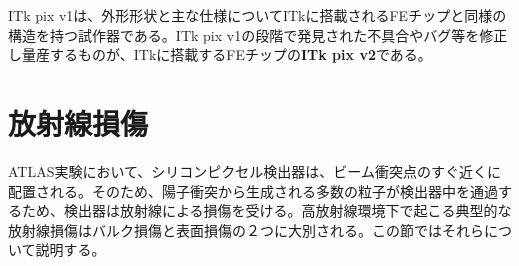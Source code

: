 

ITk pix v1は、外形形状と主な仕様についてITkに搭載されるFEチップと同様の構造を持つ試作器である。ITk pix v1の段階で発見された不具合やバグ等を修正し量産するものが、ITkに搭載するFEチップの\textbf{ITk pix v2}である。



\section{放射線損傷}
\label{sec:houshasennsonnshou}
ATLAS実験において、シリコンピクセル検出器は、ビーム衝突点のすぐ近くに配置される。そのため、陽子衝突から生成される多数の粒子が検出器中を通過するため、検出器は放射線による損傷を受ける。高放射線環境下で起こる典型的な放射線損傷はバルク損傷と表面損傷の２つに大別される。この節ではそれらについて説明する。


